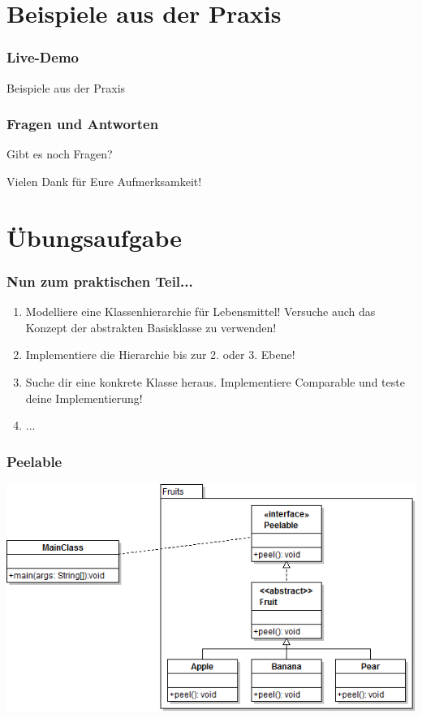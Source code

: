 \documentclass[12pt]{beamer}
\begin{document}
\section{Beispiele aus der Praxis}

\begin{frame}
	\frametitle{Live-Demo}
	\vspace*{\fill}
		\centerline{\huge Beispiele aus der Praxis}
	\vspace*{\fill}
\end{frame}

\begin{frame}
	\frametitle{Fragen und Antworten}
	\vspace*{\fill}
		\centerline{\large Gibt es noch Fragen?}
	\vspace*{\fill}
		\pause
		\centerline{\large Vielen Dank für Eure Aufmerksamkeit!}
	\vspace*{\fill}
\end{frame}

\section{Übungsaufgabe}

\begin{frame}
	\frametitle{Nun zum praktischen Teil...}
	\begin{enumerate}
		\item Modelliere eine Klassenhierarchie für Lebensmittel! Versuche auch das
		Konzept der abstrakten Basisklasse zu verwenden!
		\item Implementiere die Hierarchie bis zur 2. oder 3. Ebene!
		\item Suche dir eine konkrete Klasse heraus. Implementiere Comparable und
		teste deine Implementierung!
		\item ...
	\end{enumerate}
\end{frame}

\begin{frame}
	\frametitle{Peelable}
	\centerline{\includegraphics[scale=0.5]{src/img/Fruits}}
\end{frame}
\end{document}
